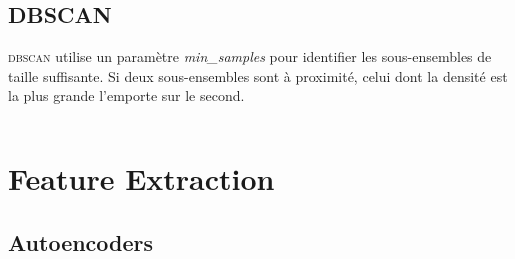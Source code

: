 \documentclass[../../cs-notes.tex]{subfiles}
\begin{document}
	\section{DBSCAN}
	\textsc{dbscan} utilise un paramètre \textit{min\_samples} pour identifier les sous-ensembles de taille suffisante.
	Si deux sous-ensembles sont à proximité, celui dont la densité est la plus grande l'emporte sur le second.

	\inputminted{python}{code/machine-learning/unsupervised-learning/dbscan.py}

	\chapter{Feature Extraction}

	\section{Autoencoders}

	
\end{document}
